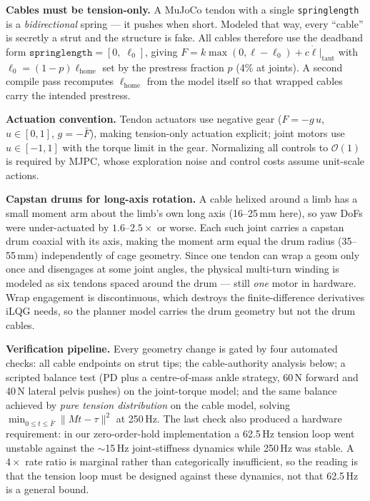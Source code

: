 \documentclass[conference]{IEEEtran}
\newcommand{\Fmax}{\bar{F}}
\begin{document}
\textbf{Cables must be tension-only.} A MuJoCo tendon with a single
\texttt{springlength} is a \emph{bidirectional} spring --- it pushes when
short. Modeled that way, every ``cable'' is secretly a strut and the structure
is fake. All cables therefore use the deadband form
$\texttt{springlength}=[0,\;\ell_0]$, giving
$F=k\max(0,\ell-\ell_0)+c\dot\ell|_{\text{taut}}$ with
$\ell_0=(1-p)\ell_{\text{home}}$ set by the prestress fraction $p$ (4\% at
joints). A second compile pass recomputes $\ell_{\text{home}}$ from the model
itself so that wrapped cables carry the intended prestress.

\textbf{Actuation convention.} Tendon actuators use negative gear
($F=-g\,u$, $u\in[0,1]$, $g=-\Fmax$), making tension-only actuation explicit;
joint motors use $u\in[-1,1]$ with the torque limit in the gear. Normalizing
all controls to $\mathcal{O}(1)$ is required by MJPC, whose exploration noise
and control costs assume unit-scale actions.

\textbf{Capstan drums for long-axis rotation.} A cable helixed around a limb
has a small moment arm about the limb's own long axis (16--25\,mm here), so
yaw DoFs were under-actuated by $1.6$--$2.5\times$ or worse. Each such joint
carries a capstan drum coaxial with its axis, making
the moment arm equal the drum radius (35--55\,mm) independently of cage
geometry. Since one tendon can wrap a geom only once and disengages at some
joint angles, the physical multi-turn winding is modeled as six tendons spaced
around the drum --- still \emph{one} motor in hardware. Wrap engagement is
discontinuous, which destroys the finite-difference derivatives iLQG needs, so
the planner model carries the drum geometry but not the drum cables.

\textbf{Verification pipeline.} Every geometry change is gated by four
automated checks: all cable endpoints on strut tips; the cable-authority
analysis below; a scripted balance test (PD plus a centre-of-mass ankle
strategy, 60\,N forward and 40\,N lateral pelvis pushes) on the joint-torque
model; and the same balance achieved by \emph{pure tension distribution} on
the cable model, solving $\min_{0\le t\le\Fmax}\|Mt-\tau\|^2$ at 250\,Hz. The
last check also produced a hardware requirement: in our zero-order-hold
implementation a 62.5\,Hz tension loop went unstable against the $\sim$15\,Hz
joint-stiffness dynamics while 250\,Hz was stable. A $4\times$ rate ratio is
marginal rather than categorically insufficient, so the reading is that the
tension loop must be designed against these dynamics, not that 62.5\,Hz is a
general bound.
\end{document}
